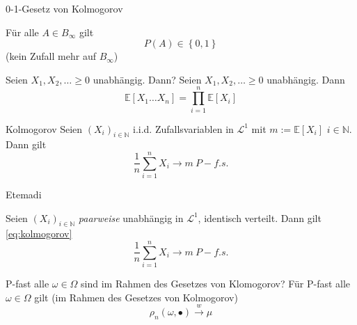 \documentclass[avery5371,grid,frame]{flashcards} %
\newcommand{\1}{ \mathbb{1} } %
\begin{document}
\begin{flashcard}[Satz]{0-1-Gesetz von Kolmogorov}
  \begin{comment}
    Eigentlich Satz 1.6
  \end{comment}


  Für alle $A\in B_{\infty}$ gilt
  \[
  P\left(A\right)\in\left\{ 0,1\right\} 
  \]
  (kein Zufall mehr auf $B_{\infty}$)
\end{flashcard}

\begin{flashcard}[Satz]{  Seien $X_{1},X_{2},\ldots\geq0$ unabhängig. Dann?}
  Seien $X_{1},X_{2},\ldots\geq0$ unabhängig. Dann 
  \[
  \mathbb{E}\left[X_{1}\ldots X_{n}\right]=\prod_{i=1}^{n}\mathbb{E}\left[X_{i}\right]
  \]
\end{flashcard}

\begin{flashcard}[Satz]{Kolmogorov}
  Seien $\left(X_{i}\right)_{i\in\mathbb{N}}$ i.i.d. Zufallsvariablen in $\mathcal{L}^{1}$
  mit $m:=\mathbb{E}\left[X_{i}\right]$ $i\in\mathbb{N}$. Dann gilt
  \begin{equation}
    \frac{1}{n}\sum_{i=1}^{n}X_{i}\to m\ P-f.s.\label{eq:kolmogorov}
  \end{equation}

\end{flashcard}

\begin{flashcard}[Satz]{Etemadi}

  Seien $\left(X_{i}\right)_{i\in\mathbb{N}}$ \emph{paarweise }unabhängig
  in $\mathcal{L}^{1}$, identisch verteilt. Dann gilt \ref{eq:kolmogorov}
  \[
  \frac{1}{n}\sum_{i=1}^{n}X_{i}\to m\ P-f.s.
  \]
\end{flashcard}

\begin{flashcard}[Satz]{P-fast alle $\omega \in \Omega$ sind im Rahmen des Gesetzes von Klomogorov?}
  Für P-fast alle $\omega\in\Omega$ gilt (im Rahmen des Gesetzes von
  Kolmogorov)
  \[
  \rho_{n}\left(\omega,\bullet\right)\overset{w}{\longrightarrow}\mu
  \]
\end{flashcard}
\end{document}
